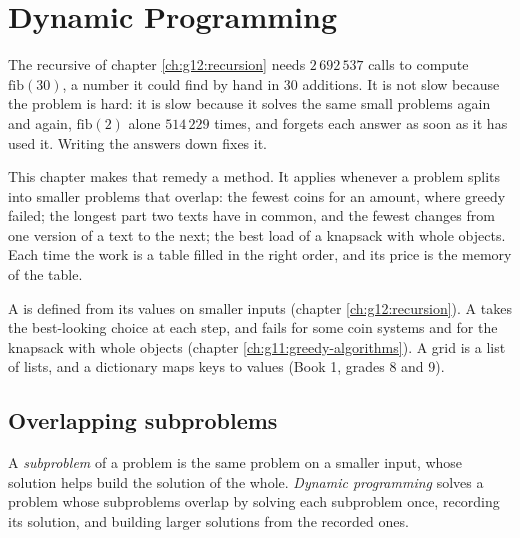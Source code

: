 \chapter{Dynamic Programming}\label{ch:g12:dynamic-programming}

The recursive  of chapter \ref{ch:g12:recursion} needs $2\,692\,537$ calls to compute $\mathrm{fib}(30)$,
a number it could find by hand in $30$ additions. It is not slow because the problem is hard: it is slow because it
solves the same small problems again and again, $\mathrm{fib}(2)$ alone $514\,229$ times, and forgets each answer as
soon as it has used it. Writing the answers down fixes it.

This chapter makes that remedy a method. It applies whenever a problem splits into smaller problems that overlap:
the fewest coins for an amount, where greedy failed; the longest part two texts have in common, and the fewest
changes from one version of a text to the next; the best load of a knapsack with whole objects. Each time the work
is a table filled in the right order, and its price is the memory of the table.

\begin{recall}
A  is defined from its values on smaller inputs (chapter \ref{ch:g12:recursion}). A  takes the best-looking choice at each step, and fails for some coin systems and for the knapsack with whole
objects (chapter \ref{ch:g11:greedy-algorithms}). A grid is a list of lists, and a dictionary maps keys to values
(Book 1, grades 8 and 9).
\end{recall}

\section{Overlapping subproblems}\label{sec:g12:dynamic-programming:overlap}

\begin{definition}\label{def:g12:dynamic-programming:dp}
A \emph{subproblem} of a problem is the same problem on a smaller input, whose solution helps build
the solution of the whole. \emph{Dynamic programming} solves a problem whose subproblems
overlap by solving each subproblem once, recording its solution, and building larger solutions from the recorded
ones.
\end{definition}

